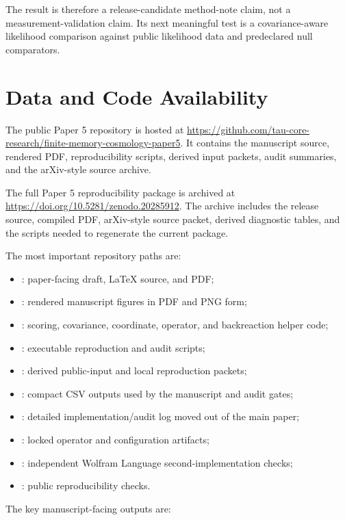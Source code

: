 \documentclass[11pt]{article}
\begin{document}
The result is therefore a release-candidate method-note claim, not a
measurement-validation claim. Its next meaningful test is a covariance-aware
likelihood comparison against public likelihood data and predeclared null
comparators.

\section{Data and Code Availability}

The public Paper 5 repository is hosted at
\url{https://github.com/tau-core-research/finite-memory-cosmology-paper5}. It
contains the manuscript source, rendered PDF, reproducibility scripts, derived
input packets, audit summaries, and the arXiv-style source archive.

The full Paper 5 reproducibility package is archived at
\url{https://doi.org/10.5281/zenodo.20285912}. The archive includes the release
source, compiled PDF, arXiv-style source packet, derived diagnostic tables, and
the scripts needed to regenerate the current package.

The most important repository paths are:

\begin{itemize}
\item {}: paper-facing draft, LaTeX source, and PDF;
\item {}: rendered manuscript figures in PDF and PNG form;
\item {}: scoring, covariance, coordinate, operator, and backreaction helper code;
\item {}: executable reproduction and audit scripts;
\item {}: derived public-input and local reproduction packets;
\item {}: compact CSV outputs used by the manuscript and audit gates;
\item {}: detailed implementation/audit log moved out of the main paper;
\item {}: locked operator and configuration artifacts;
\item {}: independent Wolfram Language second-implementation checks;
\item {}: public reproducibility checks.
\end{itemize}

The key manuscript-facing outputs are:
\end{document}
